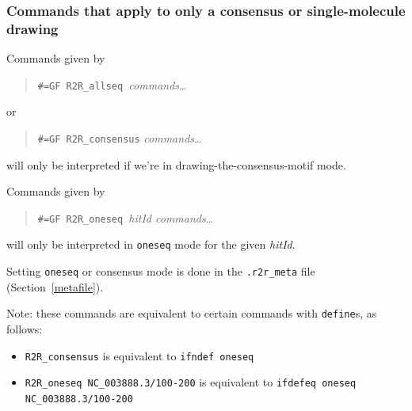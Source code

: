 \documentclass[letterpaper,12pt]{report}
\newcommand{\example}[1]{
\begin{quote}
{\raggedright
#1
}
\end{quote}
}
\begin{document}
\subsubsection{Commands that apply to only a consensus or single-molecule drawing}
Commands given by

\example{{\tt \#=GF R2R\_allseq }\textit{commands}{\dots}}

or

\example{{\tt \#=GF R2R\_consensus} \textit{commands}{\dots}}

will only be interpreted if we{\textquoteright}re in
drawing-the-consensus-motif mode.

Commands given by

\example{{\tt \#=GF R2R\_oneseq }\textit{hitId commands}{\dots}}

will only be interpreted in {\tt oneseq} mode for the given \textit{hitId}.

Setting {\tt oneseq} or consensus mode is done in the {\tt .r2r\_meta} file
(Section~\ref{metafile}).

Note: these commands are equivalent to certain commands with {\tt define}s, as follows:
\begin{itemize}
\item {\tt R2R\_consensus} is equivalent to {\tt ifndef oneseq}
\item {\tt R2R\_oneseq NC\_003888.3/100-200} is equivalent to {\tt ifdefeq oneseq NC\_003888.3/100-200}
\end{itemize}
\end{document}
